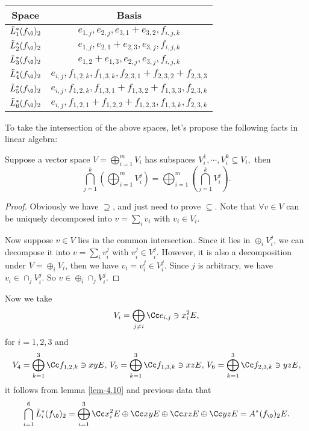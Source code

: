 \begin{center}
  \begin{tabular}{ c |  c }
    Space &Basis \\
    \hline
    $\tilde L_1^*(f_\0)_2$ & $e_{1,j},e_{2,j} ,e_{3,1}+e_{3,2},f_{i,j,k}$ \\
    $\tilde L_2^*(f_\0)_2$ & $e_{1,j},e_{2,1}+e_{2,3} ,e_{3,j},f_{i,j,k}$\\
    $\tilde L_3^*(f_\0)_2$ & $e_{1,2}+e_{1,3},e_{2,j} ,e_{3,j},f_{i,j,k}$ \\
    $\tilde L_4^*(f_\0)_2$ & $e_{i,j},f_{1,2,k}, f_{1,3,k},f_{2,3,1}+f_{2,3,2}+f_{2,3,3}$ \\
    $\tilde L_5^*(f_\0)_2$ &  $e_{i,j},f_{1,2,k}, f_{1,3,1}+f_{1,3,2}+f_{1,3,3}, f_{2,3,k}$\\
    $\tilde L_6^*(f_\0)_2$ & $e_{i,j}, f_{1,2,1}+f_{1,2,2}+f_{1,2,3},f_{1,3,k},f_{2,3,k}$\\
  \end{tabular}
\end{center}

To take the intersection of the above spaces, let's propose the following facts in linear algebra:
\begin{lemma}\label{lem-4.10}
  Suppose a vector space 
  $V=\bigoplus_{i=1}^m V_i$ has subspaces $V_i^1,\cdots, V_i^k \subseteq V_i,$ then
  \[\bigcap_{j=1}^k \left( \bigoplus_{i=1}^m V_i^j \right)
    =\bigoplus_{i=1}^m
  \left( \bigcap_{j=1}^kV_i^j\right) .\] 
\end{lemma}
\begin{proof}
  Obviously we have $\supseteq$, and just need to prove $\subseteq$. Note that $\forall v\in V$ can be uniquely decomposed into 
  $v=\sum_i v_i$
  with $v_i \in V_i$. 

  Now suppose $v\in V$ lies in the common intersection. Since it lies in $\oplus_i V_i^j$, we can decompose it into 
  $v=\sum_i v_i^j$
  with $v_i^j\in V_i^j$. However, it is also a decomposition under $V=\oplus_i V_i$, then we have $v_i=v_i^j\in V_i^j.$ Since $j$ is arbitrary, we have $v_i\in \cap_j V_i^j$. So $v\in \oplus_i \cap_j V_i^j.$
\end{proof}

Now we take
\[V_i=\bigoplus_{j\not=i} \Cc e_{i,j} \ni x_i^2 E,\]
for $i=1,2,3$ and 
\begin{align*}
  V_4=\bigoplus_{k=1}^3 \Cc f_{1,2,k}\ni xy E,\,
  V_5=\bigoplus_{k=1}^3 \Cc f_{1,3,k}\ni xz E,\,
  V_6=\bigoplus_{k=1}^3 \Cc f_{2,3,k}\ni yz E,
\end{align*}
it follows from lemma \ref{lem-4.10} and previous data  that 
\[\bigcap_{i=1}^6 \tilde L_i^*(f_\0)_2=\bigoplus _{i=1}^3 \Cc x_i^2 E
  \oplus \Cc xyE
  \oplus \Cc xzE 
\oplus \Cc yzE = A^*(f_\0)_2 E.\]


